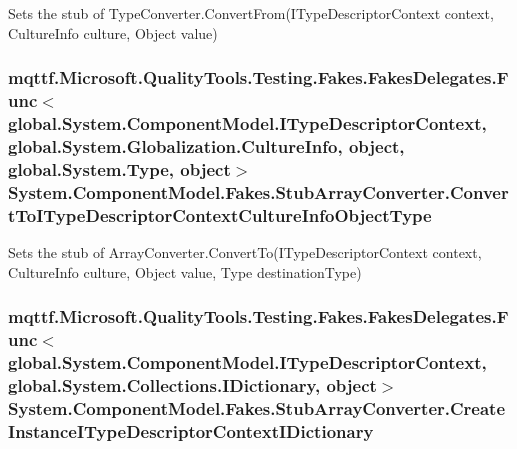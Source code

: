 Sets the stub of Type\-Converter.\-Convert\-From(\-I\-Type\-Descriptor\-Context context, Culture\-Info culture, Object value)

\hypertarget{class_system_1_1_component_model_1_1_fakes_1_1_stub_array_converter_aaff068a64544347b5e2d2348575c9281}{
\subsubsection[{Convert\-To\-I\-Type\-Descriptor\-Context\-Culture\-Info\-Object\-Type}]{\setlength{\rightskip}{0pt plus 5cm}mqttf.\-Microsoft.\-Quality\-Tools.\-Testing.\-Fakes.\-Fakes\-Delegates.\-Func$<$global.\-System.\-Component\-Model.\-I\-Type\-Descriptor\-Context, global.\-System.\-Globalization.\-Culture\-Info, object, global.\-System.\-Type, object$>$ System.\-Component\-Model.\-Fakes.\-Stub\-Array\-Converter.\-Convert\-To\-I\-Type\-Descriptor\-Context\-Culture\-Info\-Object\-Type}}\label{class_system_1_1_component_model_1_1_fakes_1_1_stub_array_converter_aaff068a64544347b5e2d2348575c9281}


Sets the stub of Array\-Converter.\-Convert\-To(\-I\-Type\-Descriptor\-Context context, Culture\-Info culture, Object value, Type destination\-Type)

\hypertarget{class_system_1_1_component_model_1_1_fakes_1_1_stub_array_converter_ab632777875a35e4007b687c2091d2fce}{
\subsubsection[{Create\-Instance\-I\-Type\-Descriptor\-Context\-I\-Dictionary}]{\setlength{\rightskip}{0pt plus 5cm}mqttf.\-Microsoft.\-Quality\-Tools.\-Testing.\-Fakes.\-Fakes\-Delegates.\-Func$<$global.\-System.\-Component\-Model.\-I\-Type\-Descriptor\-Context, global.\-System.\-Collections.\-I\-Dictionary, object$>$ System.\-Component\-Model.\-Fakes.\-Stub\-Array\-Converter.\-Create\-Instance\-I\-Type\-Descriptor\-Context\-I\-Dictionary}}\label{class_system_1_1_component_model_1_1_fakes_1_1_stub_array_converter_ab632777875a35e4007b687c2091d2fce}


